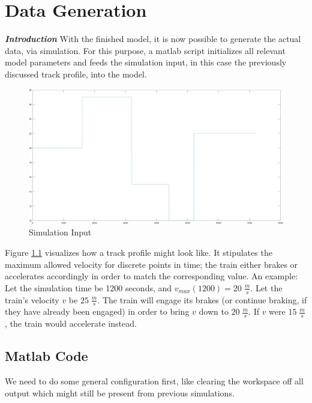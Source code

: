 \chapter{Data Generation}
\label{chap:DataGeneration}
\par\noindent
\textit{\textbf{Introduction}} With the finished model, it is now possible to generate the actual data, via simulation. For this purpose, a matlab script initializes all relevant model parameters and feeds the simulation input, in this case the previously discussed track profile, into the model. 

\begin{figure}[H]
	\centering
	\includegraphics[width=\linewidth]{./pic/input}
	\caption{Simulation Input}
	\label{fig:siminput}
\end{figure}

\par\noindent
Figure \ref{fig:siminput} visualizes how a track profile might look like. It stipulates the maximum allowed velocity for discrete points in time; the train either brakes or accelerates accordingly in order to match the corresponding value. An example: Let the simulation time be 1200 seconds, and $v_{max}(1200)=20 \; \frac{m}{s}$. Let the train's velocity $v$ be $25 \; \frac{m}{s}$. The train will engage its brakes (or continue braking, if they have already been engaged) in order to bring $v$ down to $20 \; \frac{m}{s}$. If $v$ were $15 \; \frac{m}{s}$, the train would accelerate instead.

\section{Matlab Code}
\label{sec:MatlabCode}
\par\noindent
We need to do some general configuration first, like clearing the workspace off all output which might still be present from previous simulations. 

